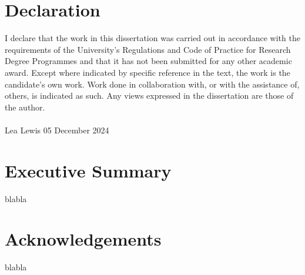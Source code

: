 \documentclass[11pt,a4paper]{article}
\numberwithin{figure}{section}
\newcommand{\dhorline}[3][0]{
    \tikz[baseline]{\path[decoration={markings,
      mark=between positions 0 and 1 step 2*#3
      with {\node[fill, circle, minimum width=#3, inner sep=0pt, anchor=south west] {};}},postaction={decorate}]  (0,#1) -- ++ (#2,0);}}
\begin{document}
   \section*{Declaration}
   I declare that the work in this dissertation was carried out in accordance with the requirements
   of the University’s Regulations and Code of Practice for Research Degree Programmes and
   that it has not been submitted for any other academic award. Except where indicated by
   specific reference in the text, the work is the candidate’s own work. Work done in collaboration
   with, or with the assistance of, others, is indicated as such. Any views expressed in the
   dissertation are those of the author.
   \vspace{40mm} \\
   \dhorline{\linewidth}{2pt} \\
   Lea Lewis
   \hfill
   05 December 2024
   \clearpage

   \section*{Executive Summary}
   blabla
   \clearpage


   \section*{Acknowledgements}
   blabla
   \clearpage

   \renewcommand{\contentsname}{Table of Contents}
   \setcounter{tocdepth}{3}
   \tableofcontents
   \clearpage


   
   
   
   
   
   
   
   
\end{document}
